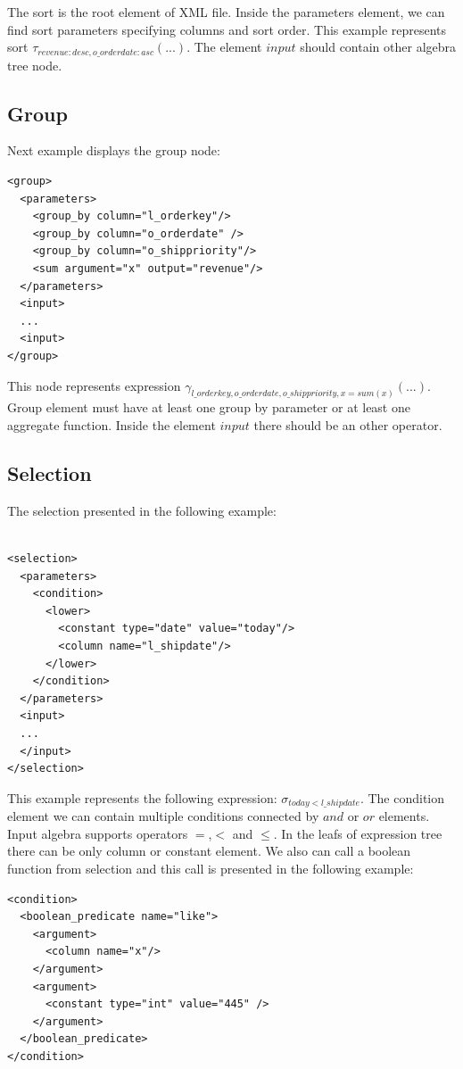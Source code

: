 The sort is the root element of XML file. Inside the parameters element, we can find sort parameters specifying columns and sort order. This example represents sort $\tau_{revenue:desc,o\_orderdate:asc}(...)$. The element $input$ should contain other algebra tree node.

\subsection{Group}

Next example displays the group node:

\begin{lstlisting}
<group>
  <parameters>
    <group_by column="l_orderkey"/>
    <group_by column="o_orderdate" />
    <group_by column="o_shippriority"/>
    <sum argument="x" output="revenue"/>
  </parameters>
  <input>
  ...
  <input>
</group>
\end{lstlisting}

This node represents expression $\gamma_{l\_orderkey,o\_orderdate,o\_shippriority,x=sum(x)}(...)$. Group element must have at least one group by parameter or at least one aggregate function. Inside the element $input$ there should be an other operator.

\subsection{Selection}

The selection presented in the following example:

\begin{lstlisting}

<selection>
  <parameters>
    <condition>
      <lower>
        <constant type="date" value="today"/>
        <column name="l_shipdate"/>
      </lower>
    </condition>
  </parameters>
  <input>
  ...
  </input>
</selection>
\end{lstlisting}
This example represents the following expression: $\sigma_{today<l\_shipdate}$. The condition element we can contain multiple conditions connected by $and$ or $or$ elements. Input algebra supports operators $=$,$<$ and $\leq$. In the leafs of expression tree there can be only column or constant element. We also can call a boolean function from selection and this call is presented in the following example:

\begin{lstlisting}
<condition>
  <boolean_predicate name="like">
    <argument>
      <column name="x"/>
    </argument>
    <argument>
      <constant type="int" value="445" />
    </argument>
  </boolean_predicate>
</condition>
\end{lstlisting}

